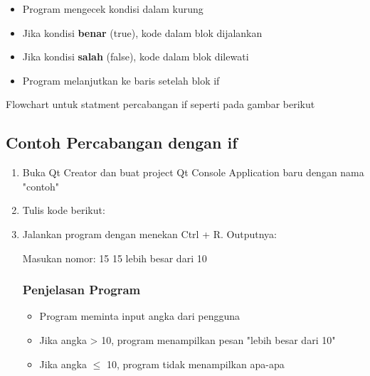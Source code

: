 \begin{itemize}
\item Program mengecek kondisi dalam kurung
\item Jika kondisi \textbf{benar} (true), kode dalam blok dijalankan
\item Jika kondisi \textbf{salah} (false), kode dalam blok dilewati
\item Program melanjutkan ke baris setelah blok if
\end{itemize}

Flowchart untuk statment percabangan if seperti pada gambar berikut




\subsection*{Contoh Percabangan dengan if}

\begin{enumerate}
\item Buka Qt Creator dan buat project Qt Console Application baru dengan nama "contoh"
\item Tulis kode berikut:



\item Jalankan program dengan menekan Ctrl + R. Outputnya:

\begin{lcverbatim}
Masukan nomor: 15
15 lebih besar dari 10
\end{lcverbatim}

\subsubsection*{Penjelasan Program}
\begin{itemize}
\item Program meminta input angka dari pengguna
\item Jika angka > 10, program menampilkan pesan "lebih besar dari 10"
\item Jika angka $\leq$ 10, program tidak menampilkan apa-apa
\end{itemize}
\end{enumerate}
